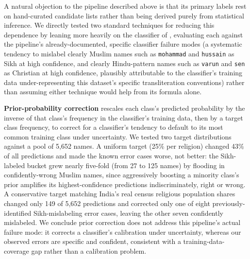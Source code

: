 \documentclass[11pt]{article}
\begin{document}
A natural objection to the pipeline described above is that its primary labels rest on hand-curated candidate lists rather than being derived purely from statistical inference. We directly tested two standard techniques for reducing this dependence by leaning more heavily on the classifier of \citet{chaturvedi2023}, evaluating each against the pipeline's already-documented, specific classifier failure modes (a systematic tendency to mislabel clearly Muslim names such as \texttt{mohammad} and \texttt{hussain} as Sikh at high confidence, and clearly Hindu-pattern names such as \texttt{varun} and \texttt{sen} as Christian at high confidence, plausibly attributable to the classifier's training data under-representing this dataset's specific transliteration conventions) rather than assuming either technique would help from its formula alone.

\textbf{Prior-probability correction} \citep{saerens2002} rescales each class's predicted probability by the inverse of that class's frequency in the classifier's training data, then by a target class frequency, to correct for a classifier's tendency to default to its most common training class under uncertainty. We tested two target distributions against a pool of 5,652 names. A uniform target (25\% per religion) changed 43\% of all predictions and made the known error cases worse, not better: the Sikh-labeled bucket grew nearly five-fold (from 27 to 125 names) by flooding in confidently-wrong Muslim names, since aggressively boosting a minority class's prior amplifies its highest-confidence predictions indiscriminately, right or wrong. A conservative target matching India's real census religious population shares changed only 149 of 5,652 predictions and corrected only one of eight previously-identified Sikh-mislabeling error cases, leaving the other seven confidently mislabeled. We conclude prior correction does not address this pipeline's actual failure mode: it corrects a classifier's calibration under uncertainty, whereas our observed errors are specific and confident, consistent with a training-data-coverage gap rather than a calibration problem.
\end{document}
